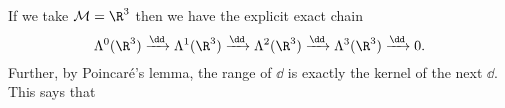 If we take $\mathcal M=\R^3$ then we have the explicit exact chain
\[
	\Lambda^0(\R^3) \xrightarrow{\dd}
	\Lambda^1(\R^3)\xrightarrow{\dd} 
	\Lambda^{2}(\R^3)\xrightarrow{\dd}  
	\Lambda^{3}(\R^3)\xrightarrow{\dd}  0.
\]
Further, by Poincar\'e's lemma, the range of $\dd$ is exactly the kernel of the next $\dd$.
This says that 
